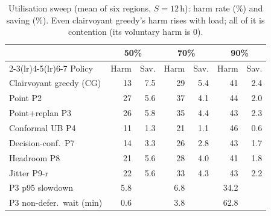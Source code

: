 \begin{table}[t]
\caption{Utilisation sweep (mean of six regions, $S{=}12$\,h): harm rate (\%) and saving (\%). Even clairvoyant greedy's harm rises with load; all of it is contention (its voluntary harm is 0).}
\label{tab:util}
\centering\scriptsize\setlength{\tabcolsep}{2.6pt}
\begin{tabular}{lrrrrrr}
\toprule
 & \multicolumn{2}{c}{50\%} & \multicolumn{2}{c}{70\%} & \multicolumn{2}{c}{90\%} \\
\cmidrule(lr){2-3}\cmidrule(lr){4-5}\cmidrule(lr){6-7}
Policy & Harm & Sav. & Harm & Sav. & Harm & Sav. \\
\midrule
Clairvoyant greedy (CG) & 13 & 7.5 & 29 & 5.4 & 41 & 2.4 \\
Point P2 & 27 & 5.6 & 37 & 4.1 & 44 & 2.0 \\
Point+replan P3 & 26 & 5.8 & 35 & 4.4 & 43 & 2.3 \\
Conformal UB P4 & 11 & 1.3 & 21 & 1.1 & 46 & 0.6 \\
Decision-conf.\ P7 & 14 & 3.3 & 26 & 2.8 & 43 & 1.7 \\
Headroom P8 & 21 & 5.6 & 28 & 4.0 & 41 & 1.8 \\
Jitter P9-r & 22 & 5.6 & 33 & 4.3 & 43 & 2.2 \\
\midrule
P3 p95 slowdown & 5.8 &  & 6.8 &  & 34.2 &  \\
P3 non-defer.\ wait (min) & 0.6 &  & 3.8 &  & 62.8 &  \\
\bottomrule
\end{tabular}
\end{table}
